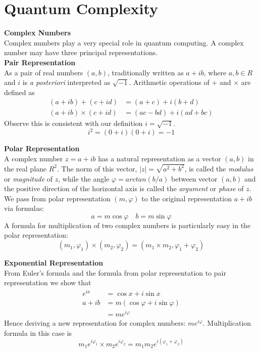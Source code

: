 \section{Quantum Complexity}
\textbf{Complex Numbers}\\
Complex numbers play a very special role in quantum computing.
A complex number may have three principal representations.\\

\textbf{Pair Representation}\\
As a pair of real numbers $(a, b)$, traditionally written as $a + ib$,
where $a, b \in R$ and $i$ is \textit{a posteriori} interpreted as $\sqrt{-1}$.
Arithmetic operations of $+$ and $\times$ are defined as
\begin{align*}
    (a+ib) +      (c+id) &= (a+c)   + i(b+d)  \\
    (a+ib) \times (c+id) &= (ac−bd) + i(ad+bc)
\end{align*}
Observe this is consistent with our definition $i=\sqrt{-1}$.
$$i^2 = (0 + i)(0 + i) = −1$$

\textbf{Polar Representation}\\
A complex number $z = a + ib$ has a natural representation
as a vector $(a,b)$ in the real plane $R^2$.
The norm of this vector, $|z| = \sqrt{a^2 +b^2}$,
is called the \textit{modulus} or \textit{magnitude} of $z$,
while the angle $\varphi = arctan(b/a)$ between vector $(a, b)$
and the positive direction of the horizontal axis is called the \textit{argument} or \textit{phase} of $z$.
We pass from polar representation $(m, \varphi)$ to the original representation $a + ib$ via formulas:
$$a = m \cos \varphi \quad b = m \sin \varphi$$
A formula for multiplication of two complex numbers is particularly easy in the polar representation:
$$(m_1, \varphi_1) \times (m_2, \varphi_2) = (m_1 \times m_2, \varphi_1 + \varphi_2)$$

\textbf{Exponential Representation}\\
From Euler's formula and the formula from polar representation to pair representation we show that
\begin{align*}
          e^{ix} &= \cos x + i\sin x \\
          a + ib &= m(\cos\varphi + i\sin\varphi) \\
                 &= me^{i\varphi}
\end{align*}
Hence deriving a new representation for complex numbers: $me^{i\varphi}$.
Multiplication formula in this case is
$$m_1e^{i\varphi_1} \times m_2e^{i\varphi_2} = m_1m_2e^{i(\varphi_1+\varphi_2)}$$\\

